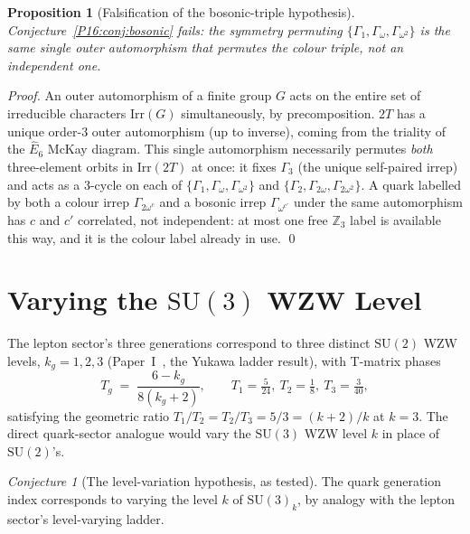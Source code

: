 \documentclass[11pt,a4paper]{article}
\newtheorem{proposition}[theorem]{Proposition}
\theoremstyle{definition}\newtheorem{definition}[theorem]{Definition}
\theoremstyle{remark}
\newtheorem{conjecture}[theorem]{Conjecture}
\theoremstyle{definition}\newtheorem{construction}[theorem]{Construction}
\newcommand{\SU}{\mathrm{SU}}
\newcommand{\twoT}{2T}
\begin{document}
\begin{proposition}[Falsification of the bosonic-triple hypothesis]
\label{P16:prop:bosonic_fail}
Conjecture~\ref{P16:conj:bosonic} fails: the symmetry permuting
$\{\Gamma_1,\Gamma_\omega,\Gamma_{\omega^2}\}$ is the \emph{same}
single outer automorphism that permutes the colour triple, not an
independent one.
\end{proposition}

\begin{proof}
An outer automorphism of a finite group $G$ acts on the entire set of
irreducible characters $\mathrm{Irr}(G)$ simultaneously, by
precomposition. $\twoT$ has a unique order-$3$ outer automorphism (up
to inverse), coming from the triality of the $\widehat{E}_6$ McKay
diagram. This single automorphism necessarily permutes
\emph{both} three-element orbits in $\mathrm{Irr}(\twoT)$ at once: it
fixes $\Gamma_3$ (the unique self-paired irrep) and acts as a
$3$-cycle on each of $\{\Gamma_1,\Gamma_\omega,\Gamma_{\omega^2}\}$
and $\{\Gamma_2,\Gamma_{2\omega},\Gamma_{2\omega^2}\}$. A quark
labelled by both a colour irrep $\Gamma_{2\omega^c}$ and a bosonic
irrep $\Gamma_{\omega^{c'}}$ under the same automorphism has $c$ and
$c'$ correlated, not independent: at most one free $\mathbb{Z}_3$
label is available this way, and it is the colour label already in
use.
\qed
\end{proof}

\section{Varying the $\SU(3)$ WZW Level}
\label{P16:sec:level}

The lepton sector's three generations correspond to three distinct
$\SU(2)$ WZW levels, $k_g=1,2,3$ (Paper~I~\cite{Paper1},
the Yukawa ladder result), with T-matrix phases
\begin{equation}
  T_g \;=\; \frac{6-k_g}{8(k_g+2)},
  \qquad
  T_1=\tfrac{5}{24},\ T_2=\tfrac18,\ T_3=\tfrac{3}{40},
  \label{P16:eq:lepton_Tg}
\end{equation}
satisfying the geometric ratio $T_1/T_2=T_2/T_3=5/3=(k+2)/k$ at
$k=3$. The direct quark-sector analogue would vary the $\SU(3)$ WZW
level $k$ in place of $\SU(2)$'s.

\begin{conjecture}[The level-variation hypothesis, as tested]
\label{P16:conj:level}
The quark generation index corresponds to varying the level $k$ of
$\SU(3)_k$, by analogy with the lepton sector's level-varying ladder.
\end{conjecture}
\end{document}
